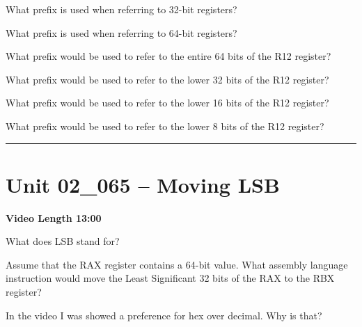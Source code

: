 \documentclass[letterpaper,12pt]{exam}
\newcommand{\unit}{Unit 02}
\begin{document}
\begin{questions}
\begin{samepage}
    \question What prefix is used when referring to 32-bit registers?
    \vspace{5mm}
\end{samepage}
\par
\begin{samepage}
    \question What prefix is used when referring to 64-bit registers?
    \vspace{5mm}
\end{samepage}
\par
\begin{samepage}
    \question What prefix would be used to refer to the entire 64 bits of the R12 register?
    \vspace{5mm}
\end{samepage}
\par
\begin{samepage}
    \question What prefix would be used to refer to the lower 32 bits of the R12 register?
    \vspace{5mm}
\end{samepage}
\par
    \begin{samepage}
        \question What prefix would be used to refer to the lower 16 bits of the R12 register?
        \vspace{5mm}
    \end{samepage}
    \par
\begin{samepage}
    \question What prefix would be used to refer to the lower 8 bits of the R12 register?
    \vspace{5mm}
\end{samepage}
\par
      
    \rule{0.5\textwidth}{.4pt} %
\section*{\unit\_065 -- Moving LSB }
\par{\selectfont\textbf{Video Length 13:00}}
\begin{samepage}
    \question What does LSB stand for?
    \vspace{5mm}
\end{samepage}
\par
 
\begin{samepage}
    \question Assume that the RAX register contains a 64-bit value.  What assembly language instruction would move the Least Significant 32 bits of the RAX to the RBX register?
    \vspace{5mm}
\end{samepage}
\begin{samepage}
    \question In the video I was showed a preference for hex over decimal.  Why is that?
    \vspace{35mm}
\end{samepage}
\par

\end{questions}
\end{document}
